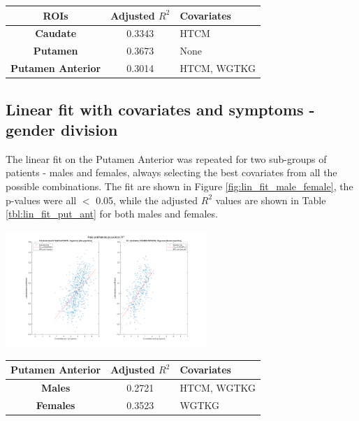 \documentclass[]{article}
\newenvironment{Figure}
{\par\medskip\noindent\minipage{\linewidth}}
{\endminipage\par\medskip}
\begin{document}
\begin{multicols}{2}
\begin{center}
	\centering
	\tiny
	\begin{tabular}{|c|c|l|}
		\hline
		\textbf{ROIs}             & \textbf{Adjusted $R^2$} & \textbf{Covariates} \\ \hline
		\textbf{Caudate}          & 0.3343                  & HTCM                \\ \hline
		\textbf{Putamen}          & 0.3673                  & None                \\ \hline
		\textbf{Putamen Anterior} & 0.3014                  & HTCM, WGTKG         \\ \hline
	\end{tabular}
	\label{tbl:R_squared_fit_pd}
\end{center}



\subsection{Linear fit with covariates and symptoms - gender division}

The linear fit on the Putamen Anterior was repeated for two sub-groups of patients - males and females, always selecting the best covariates from all the possible combinations. The fit are shown in Figure \ref{fig:lin_fit_male_female}, the p-values were all $<$ 0.05, while the adjusted $R^2$ values are shown in Table \ref{tbl:lin_fit_put_ant} for both males and females.


\begin{Figure}
	\centering
	\includegraphics[width=3in]{../fit_covariates_male_female}
	\label{fig:lin_fit_male_female}
\end{Figure} 

\begin{center}
	\centering
	\tiny
	\begin{tabular}{|c|c|l|}
		\hline
		\textbf{Putamen Anterior} & \textbf{Adjusted $R^2$} & \textbf{Covariates} \\ \hline
		\textbf{Males}            & 0.2721                  & HTCM, WGTKG         \\ \hline
		\textbf{Females}          & 0.3523                  & WGTKG               \\ \hline
	\end{tabular}
	\label{tbl:lin_fit_put_ant}
\end{center}



\end{multicols}
\end{document}
